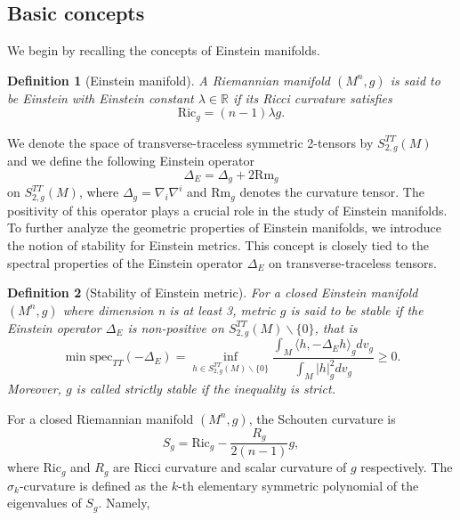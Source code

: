 \documentclass[12pt]{amsart}
\newtheorem{define}{Definition}[section]
\numberwithin{equation}{section}
\begin{document}
\subsection{Basic concepts}

We begin by recalling the concepts of Einstein manifolds.
\begin{define}[Einstein manifold]
     A Riemannian manifold $(M^n, g)$ is said to be Einstein with Einstein constant $\lambda \in \mathbb{R}$ if its Ricci curvature satisfies
    \begin{equation*}
        \mathrm{Ric}_g = (n-1)\lambda g.
    \end{equation*}
\end{define}

We denote the space of transverse-traceless symmetric 2-tensors by $S_{2,g}^{TT}(M)$ and we define the following Einstein operator
\begin{equation*}
    \Delta_E = \Delta_g + 2\mathrm{Rm}_g
\end{equation*}
on $S_{2,g}^{TT}(M)$, where $\Delta_g=\nabla_i\nabla^i$ and $\mathrm{Rm}_g$ denotes the curvature tensor. The positivity of this operator plays a crucial role in the study of Einstein manifolds. To further analyze the geometric properties of Einstein manifolds, we introduce the notion of stability for Einstein metrics. This concept is closely tied to the spectral properties of the Einstein operator $\Delta_E$ on transverse-traceless tensors.
\begin{define}[Stability of Einstein metric]
    For a closed Einstein manifold $(M^n,g)$ where dimension n is at least 3, metric $g$ is said to be stable if the Einstein operator $\Delta_E$ is non-positive on $S_{2,g}^{TT}(M)\backslash\{0\}$, that is
    \begin{equation*}
        \min \mathrm{spec}_{TT}(-\Delta_E)=\inf_{h\in S_{2,g}^{TT}(M)\backslash\{0\}}\frac{\int_M \langle h,-\Delta_E h \rangle_g dv_g}{\int_M |h|_g^2 dv_g} \geq 0.
    \end{equation*}
    Moreover, $g$ is called strictly stable if the inequality is strict.
\end{define}

For a closed Riemannian manifold $(M^n,g)$, the Schouten curvature is  
\begin{equation*}
    S_g=\mathrm{Ric}_g - \frac{R_g}{2(n-1)}g,
\end{equation*}
where $\mathrm{Ric}_g$ and $R_g$ are Ricci curvature and scalar curvature of $g$ respectively. The $\sigma_k$-curvature is defined as the $k$-th elementary symmetric polynomial of the eigenvalues of $S_g$. Namely,
\end{document}
